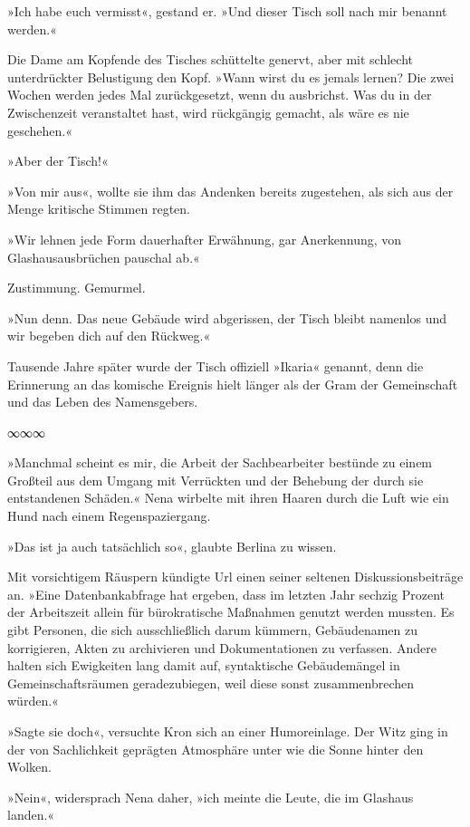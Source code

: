 »Ich habe euch vermisst«, gestand er. »Und dieser Tisch soll nach mir benannt werden.«

Die Dame am Kopfende des Tisches schüttelte genervt, aber mit schlecht unterdrückter Belustigung den Kopf. »Wann wirst du es jemals lernen? Die zwei Wochen werden jedes Mal zurückgesetzt, wenn du ausbrichst. Was du in der Zwischenzeit veranstaltet hast, wird rückgängig gemacht, als wäre es nie geschehen.«

»Aber der Tisch!«

»Von mir aus«, wollte sie ihm das Andenken bereits zugestehen, als sich aus der Menge kritische Stimmen regten.

»Wir lehnen jede Form dauerhafter Erwähnung, gar Anerkennung, von Glashausausbrüchen pauschal ab.«

Zustimmung. Gemurmel.

»Nun denn. Das neue Gebäude wird abgerissen, der Tisch bleibt namenlos und wir begeben dich auf den Rückweg.«

Tausende Jahre später wurde der Tisch offiziell »Ikaria« genannt, denn die Erinnerung an das komische Ereignis hielt länger als der Gram der Gemeinschaft und das Leben des Namensgebers.

\begin{center}
∞∞∞
\end{center}

»Manchmal scheint es mir, die Arbeit der Sachbearbeiter bestünde zu einem Großteil aus dem Umgang mit Verrückten und der Behebung der durch sie entstandenen Schäden.« Nena wirbelte mit ihren Haaren durch die Luft wie ein Hund nach einem Regenspaziergang.

»Das ist ja auch tatsächlich so«, glaubte Berlina zu wissen.

Mit vorsichtigem Räuspern kündigte Url einen seiner seltenen Diskussionsbeiträge an. »Eine Datenbankabfrage hat ergeben, dass im letzten Jahr sechzig Prozent der Arbeitszeit allein für bürokratische Maßnahmen genutzt werden mussten. Es gibt Personen, die sich ausschließlich darum kümmern, Gebäudenamen zu korrigieren, Akten zu archivieren und Dokumentationen zu verfassen. Andere halten sich Ewigkeiten lang damit auf, syntaktische Gebäudemängel in Gemeinschaftsräumen geradezubiegen, weil diese sonst zusammenbrechen würden.«

»Sagte sie doch«, versuchte Kron sich an einer Humoreinlage. Der Witz ging in der von Sachlichkeit geprägten Atmosphäre unter wie die Sonne hinter den Wolken.

»Nein«, widersprach Nena daher, »ich meinte die Leute, die im Glashaus landen.«

